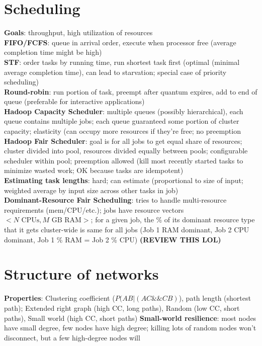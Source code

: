 \documentclass{article}
\begin{document}
\begin{multicols*}{3}
\section{Scheduling}
\textbf{Goals}: throughput, high utilization of resources \\
\textbf{FIFO/FCFS}: queue in arrival order, execute when processor free (average completion time might be high) \\
\textbf{STF}: order tasks by running time, run shortest task first (optimal (minimal average completion time), can lead to starvation; special case of priority scheduling) \\
\textbf{Round-robin}: run portion of task, preempt after quantum expires, add to end of queue (preferable for interactive applications) \\
\textbf{Hadoop Capacity Scheduler}: multiple queues (possibly hierarchical), each queue contains multiple jobs; each queue guaranteed some portion of cluster capacity; elasticity (can occupy more resources if they're free; no preemption \\
\textbf{Hadoop Fair Scheduler}: goal is for all jobs to get equal share of resources; cluster divided into pool, resources divided equally between pools; configurable scheduler within pool; preemption allowed (kill most recently started tasks to minimize wasted work; OK because tasks are idempotent) \\
\textbf{Estimating task lengths}: hard; can estimate (proportional to size of input; weighted average by input size across other tasks in job) \\
\textbf{Dominant-Resource Fair Scheduling}: tries to handle multi-resource requirements (mem/CPU/etc.); jobs have resource vectors $<N \text{ CPUs}, M \text{ GB RAM}>$; for a given job, the \% of its dominant resource type that it gets cluster-wide is same for all jobs (Job 1 RAM dominant, Job 2 CPU dominant, Job 1 \% RAM = Job 2 \% CPU) \textbf{(REVIEW THIS LOL)}

\section{Structure of networks}
\textbf{Properties}: Clustering coefficient ($P(AB | (AC \&\& CB)$), path length (shortest path); Extended right graph (high CC, long paths), Random (low CC, short paths), Small world (high CC, short paths)
\textbf{Small-world resilience}: most nodes have small degree, few nodes have high degree; killing lots of random nodes won't disconnect, but a few high-degree nodes will


\end{multicols*}
\end{document}
